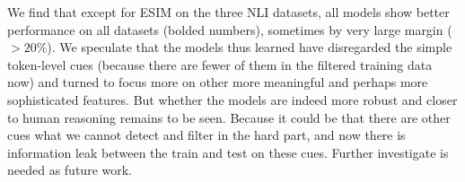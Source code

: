 We find that except for ESIM on the three NLI datasets, all models show better performance
on all datasets (bolded numbers), sometimes by very large margin ($>20\%$). We speculate that the models thus
learned have disregarded the simple token-level cues (because there are fewer of them in the filtered training data now) and turned to focus more on other more meaningful and perhaps more sophisticated features. 
But whether the models are indeed more robust and closer to human reasoning remains to be seen. 
Because it could be that there are other cues what we cannot detect and filter in
the hard part, and now there is information leak between the train and test on these cues. 
Further investigate is needed as future work.
